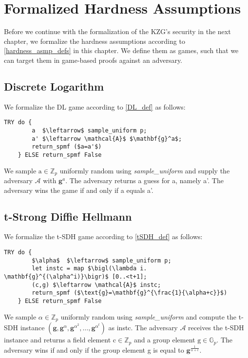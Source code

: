 \chapter{Formalized Hardness Assumptions}\label{chapter:hardness_asmps_frml}
Before we continue with the formalization of the KZG's security in the next chapter, we formalize the hardness assumptions according to \ref{hardness_asmp_defs} in this chapter. We define them as games, such that we can target them in game-based proofs against an adversary.

\section*{Discrete Logarithm}
We formalize the DL game according to \ref{DL_def} as follows: 
\begin{lstlisting}[language=isabelle]
    TRY do {
        a  $\leftarrow$ sample_uniform p;
        a' $\leftarrow \mathcal{A}$ $\mathbf{g}^a$;
        return_spmf ($a=a'$)
    } ELSE return_spmf False
\end{lstlisting}
We sample $\text{a} \in \mathbb{Z}_p$ uniformly random using \textit{sample\_uniform} and supply the adversary $\mathcal{A}$ with $\mathbf{g}^a$. The adversary returns a guess for a, namely a'. The adversary wins the game if and only if a equals a'.

\section*{t-Strong Diffie Hellmann}
We formalize the t-SDH game according to \ref{tSDH_def} as follows: 
\begin{lstlisting}[language=isabelle]
    TRY do {
        $\alpha$  $\leftarrow$ sample_uniform p;
        let instc = map $\bigl(\lambda i. \mathbf{g}^{(\alpha^i)}\bigr)$ [0..<t+1];
        (c,g) $\leftarrow \mathcal{A}$ instc;
        return_spmf ($\text{g}=\mathbf{g}^{\frac{1}{\alpha+c}}$)
    } ELSE return_spmf False
\end{lstlisting}
We sample $\alpha\in\mathbb{Z}_p$ uniformly random using \textit{sample\_uniform} and compute the t-SDH instance $(\mathbf{g}, \mathbf{g}^{\alpha}, \mathbf{g}^{\alpha^2}, \dots, \mathbf{g}^{\alpha^t})$ as instc. The adversary $\mathcal{A}$ receives the t-SDH instance and returns a field element $\text{c}\in\mathbb{Z}_p$ and a group element $\text{g}\in\mathbb{G}_p$. The adversary wins if and only if the group element g is equal to $\mathbf{g}^{\frac{1}{\alpha+c}}$.

